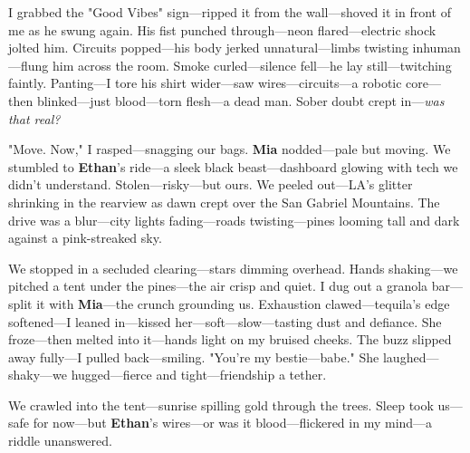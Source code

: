 \documentclass{article}
\begin{document}
I grabbed the "Good Vibes" sign—ripped it from the wall—shoved it in front of me as he swung again. His fist punched through—neon flared—electric shock jolted him. Circuits popped—his body jerked unnatural—limbs twisting inhuman—flung him across the room. Smoke curled—silence fell—he lay still—twitching faintly. Panting—I tore his shirt wider—saw wires—circuits—a robotic core—then blinked—just blood—torn flesh—a dead man. Sober doubt crept in—\textit{was that real?}

"Move. Now," I rasped—snagging our bags. \textbf{Mia} nodded—pale but moving. We stumbled to \textbf{Ethan}’s ride—a sleek black beast—dashboard glowing with tech we didn’t understand. Stolen—risky—but ours. We peeled out—LA’s glitter shrinking in the rearview as dawn crept over the San Gabriel Mountains. The drive was a blur—city lights fading—roads twisting—pines looming tall and dark against a pink-streaked sky.

We stopped in a secluded clearing—stars dimming overhead. Hands shaking—we pitched a tent under the pines—the air crisp and quiet. I dug out a granola bar—split it with \textbf{Mia}—the crunch grounding us. Exhaustion clawed—tequila’s edge softened—I leaned in—kissed her—soft—slow—tasting dust and defiance. She froze—then melted into it—hands light on my bruised cheeks. The buzz slipped away fully—I pulled back—smiling. "You’re my bestie—babe." She laughed—shaky—we hugged—fierce and tight—friendship a tether.

We crawled into the tent—sunrise spilling gold through the trees. Sleep took us—safe for now—but \textbf{Ethan}’s wires—or was it blood—flickered in my mind—a riddle unanswered.
\end{document}
